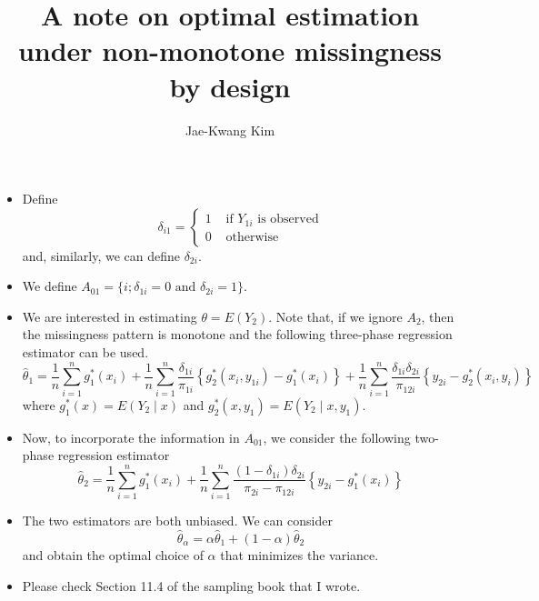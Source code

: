 \documentclass[12pt]{article}
\begin{document}
\title{A note on optimal estimation under non-monotone missingness by design }
\author{Jae-Kwang Kim}
\maketitle 


\begin{itemize}



\item Define 
$$ \delta_{i1} =
\left\{ \begin{array}{ll}
 1 & \mbox{ if } Y_{1i} \mbox{ is observed} \\
 0 & \mbox{ otherwise}
\end{array}
\right. 
$$
and, similarly, we can define 
$\delta_{2i} $. 


\item We  define $A_{01}= \{ i ; \delta_{1i} =0 \mbox{ and } \delta_{2i}=1\}$. 


\item We are interested in estimating $\theta=E(Y_2)$. Note that, if we ignore $A_2$, 
then the missingness pattern is monotone and the following three-phase regression estimator can be used. 
$$
\hat{\theta}_1 = \frac{1}{n} \sum_{i=1}^n g_1^* (x_i) + \frac{1}{n} \sum_{i=1}^n \frac{\delta_{1i}}{ \pi_{1i}} \left\{ g_2^* (x_i, y_{1i}) - g_1^*(x_i) \right\} + \frac{1}{n} \sum_{i=1}^n \frac{\delta_{1i} \delta_{2i} }{ \pi_{12i}} \left\{ y_{2i} - g_2^*(x_i, y_i) \right\} $$
where 
$ g_1^*(x)= E(Y_2 \mid x)$ and $g_2^*(x,y_1) = E(Y_2 \mid x, y_1)$. 

\item Now, to incorporate the information in $A_{01}$, we consider the following two-phase regression estimator 
$$
\hat{\theta}_2 = \frac{1}{n} \sum_{i=1}^n g_1^* (x_i) + \frac{1}{n} \sum_{i=1}^n \frac{(1-\delta_{1i} )\delta_{2i} }{ \pi_{2i} -\pi_{12i}} \left\{ y_{2i} - g_1^*(x_i) \right\} $$


\item The two estimators are both unbiased. We can consider 
$$ \hat{\theta}_\alpha = \alpha \hat{\theta}_1 + (1- \alpha) \hat{\theta}_2 $$
and obtain the optimal choice of $\alpha$ that minimizes the variance.
\item Please check Section 11.4 of the sampling book that I wrote. 
\end{itemize}
\end{document}
